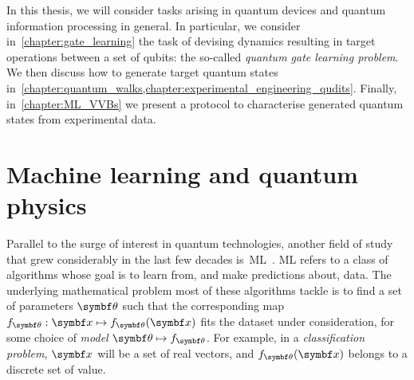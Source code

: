 In this thesis, we will consider tasks arising in quantum devices and quantum information processing in general.
In particular, we consider in~\cref{chapter:gate_learning} the task of devising dynamics resulting in target operations between a set of qubits: the so-called \emph{quantum gate learning problem}.
We then discuss how to generate target quantum states in~\cref{chapter:quantum_walks,chapter:experimental_engineering_qudits}.
Finally, in~\cref{chapter:ML_VVBs} we present a protocol to characterise generated quantum states from experimental data.

\section{Machine learning and quantum physics}
\label{sec:intro:ML}

Parallel to the surge of interest in quantum technologies, another field of study that grew considerably in the last few decades is~\ac{ML}~\cite{friedman2001elements,you2011atomic,bishop2006pattern,abu2012learning,murphy2012machine,mehta2019highbias}.
\ac{ML} refers to a class of algorithms whose goal is to learn from, and make predictions about, data.
The underlying mathematical problem most of these algorithms tackle is to find a set of parameters $\bstheta$ such that the corresponding map $f_\bstheta:\bs x\mapsto f_\bstheta(\bs x)$ fits the dataset under consideration, for some choice of \emph{model} $\bstheta\mapsto f_\bstheta$.
For example, in a \emph{classification problem}, $\bs x$ will be a set of real vectors, and $f_\bstheta(\bs x)$ belongs to a discrete set of value.


